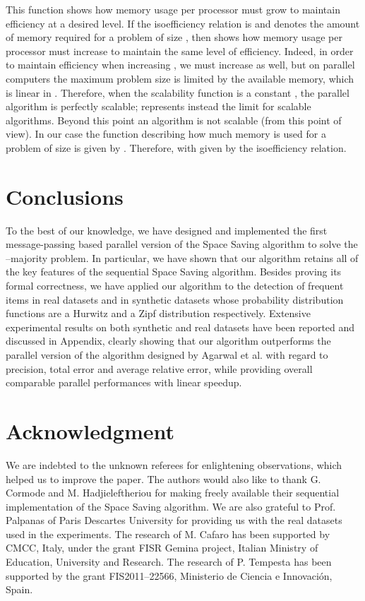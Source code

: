 \documentclass[final,3p,times]{elsarticle}
\begin{document}
This function shows how memory usage per processor must grow to maintain efficiency at a desired level. If the isoefficiency relation is  and  denotes the
amount of memory required for a problem of size , then  shows how memory usage per processor must increase to maintain the same level of efficiency. Indeed, in
order to maintain efficiency when increasing , we must increase  as well, but on parallel computers the maximum problem size is limited by the available memory, which is
linear in . Therefore, when the scalability function  is a constant , the parallel algorithm is perfectly scalable;  represents instead the limit for
scalable algorithms. Beyond this point an algorithm is not scalable (from this point of view).
In our case the function describing how much memory is used for a problem of size  is given by . Therefore,  with  given by the
isoefficiency relation.

\section{Conclusions}
\label{conclusions}


To the best of our knowledge, we have designed and implemented the first message-passing based parallel version of the Space Saving algorithm to solve the --majority problem. In particular, we have shown that our algorithm retains all of the key features of the sequential Space Saving algorithm. Besides proving its formal correctness, we have applied our algorithm to the detection of frequent items in real datasets and in synthetic datasets whose probability distribution functions are a Hurwitz and a Zipf distribution respectively. Extensive experimental results on both synthetic and real datasets have been reported and discussed in Appendix, clearly showing that our algorithm outperforms the parallel version of the algorithm designed by Agarwal et al. with regard to precision, total error and average relative error, while providing overall comparable parallel performances with linear speedup.



\section*{Acknowledgment}
We are indebted to the unknown referees for enlightening observations, which helped us to improve the paper. The authors would also like to thank G. Cormode and M. Hadjieleftheriou for making freely available their sequential implementation of the Space Saving algorithm. We are also grateful to Prof. Palpanas of Paris Descartes University for providing us with the real datasets used in the experiments. The research of M. Cafaro has been supported by CMCC, Italy, under the grant FISR Gemina project, Italian Ministry of Education, University and Research. The research of P. Tempesta has been supported by the grant FIS2011--22566, Ministerio de Ciencia e Innovaci\'on, Spain.
\end{document}
